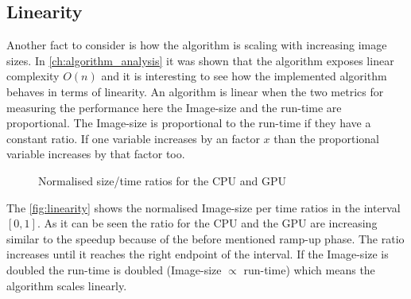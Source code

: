 \subsection{Linearity} %
\label{ssub:linearity}
Another fact to consider is how the algorithm is scaling with increasing image
sizes. In \autoref{ch:algorithm_analysis} it was shown that the algorithm
exposes linear complexity $O(n)$ and it is interesting to see how the
implemented algorithm behaves in terms of linearity. An algorithm is linear when
the two metrics for measuring the performance here the Image-size and the
run-time are proportional. The Image-size is proportional to the run-time if 
they have a constant ratio. If one variable increases by an factor $x$ than the
proportional variable increases by that factor too.
\begin{figure}[ht]
  \centering
	

	\tableA

	\caption{Normalised size/time ratios for the \protect\gls{CPU} and \protect\gls{GPU}}%
	\label{fig:linearity}
 \end{figure}

The \autoref{fig:linearity} shows the normalised Image-size per time ratios in
the interval $[0,1]$. As it can be seen the ratio for the \gls{CPU} and the
\gls{GPU} are increasing similar to the speedup because of the before mentioned
ramp-up phase. The ratio increases until it reaches the right endpoint of the
interval. If the Image-size is doubled the run-time is doubled (Image-size
$\propto$ run-time) which means the algorithm scales linearly.


